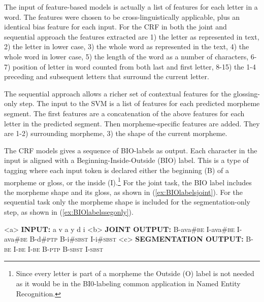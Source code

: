 The input of feature-based models is actually a list of features for each letter in a word. The features were chosen to be cross-linguistically applicable, plus an identical bias feature for each input. For the CRF in both the joint and sequential approach the features extracted are 1) the letter as represented in text, 2) the letter in lower case, 3) the whole word as represented in the text, 4) the whole word in lower case, 5) the length of the word as a number of characters, 6-7) position of letter in word counted from both last and first letter, 8-15) the 1-4 preceding and subsequent letters that surround the current letter. 

The sequential approach allows a richer set of contextual features for the glossing-only step. The input to the SVM is a list of features for each predicted morpheme segment. The first features are a concatenation of the above features for each letter in the predicted segment. Then morpheme-specific features are added. They are 1-2) surrounding morpheme, 3) the shape of the current morpheme. 

The CRF models gives a sequence of BIO-labels \citep{ramshaw1999} as output. Each character in the input is aligned with a Beginning-Inside-Outside (BIO) label. This is a type of tagging where each input token is declared either the beginning (B) of a morpheme or gloss, or the inside (I).\footnote{Since every letter is part of a morpheme the Outside (O) label is not needed as it would be in the BI0-labeling common application in Named Entity Recognition.} For the joint task, the BIO label includes the morpheme shape and its gloss, as shown in (\ref{ex:BIOlabelsjoint}). For the sequential task only the morpheme shape is included for the segmentation-only step, as shown in (\ref{ex:BIOlabelssegonly}). 

\pex   
\label{ex:BIOlabels}
\a<a> {\bf INPUT:} \hspace{3 mm}  a \hspace{2 mm}  v \hspace{2 mm} a \hspace{2 mm} y \hspace{2 mm} d \hspace{2 mm} i
\a<b> {\bf JOINT OUTPUT:} \hspace{.5 mm} B-ava\#\textsc{be} \hspace{.5 mm} I-ava\#\textsc{be}  \hspace{.5 mm} I-ava\#\textsc{be} \hspace{1 mm} B-d\#\textsc{ptp}  \hspace{.5 mm}B-i\#\textsc{sbst}  \hspace{.5 mm} I-i\#\textsc{sbst}
\label{ex:BIOlabelsjoint}
\a<c> {\bf SEGMENTATION OUTPUT:} \hspace{1 mm} B-\textsc{be} \hspace{1 mm} I-\textsc{be} \hspace{1 mm} I-\textsc{be} \hspace{1 mm} B-\textsc{ptp} \hspace{1 mm} B-\textsc{sbst} \hspace{1 mm} I-\textsc{sbst}
\label{ex:BIOlabelssegonly}
\xe


